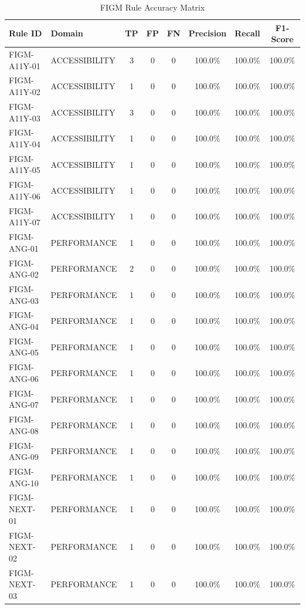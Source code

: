 \begin{table}[htbp]
\centering
\caption{FIGM Rule Accuracy Matrix}
\label{tab:rule_eval_results}
\begin{tabular}{llcccccc}
\toprule
\textbf{Rule ID} & \textbf{Domain} & \textbf{TP} & \textbf{FP} & \textbf{FN} & \textbf{Precision} & \textbf{Recall} & \textbf{F1-Score} \\
\midrule
FIGM-A11Y-01 & ACCESSIBILITY & 3 & 0 & 0 & 100.0\% & 100.0\% & 100.0\% \\
FIGM-A11Y-02 & ACCESSIBILITY & 1 & 0 & 0 & 100.0\% & 100.0\% & 100.0\% \\
FIGM-A11Y-03 & ACCESSIBILITY & 3 & 0 & 0 & 100.0\% & 100.0\% & 100.0\% \\
FIGM-A11Y-04 & ACCESSIBILITY & 1 & 0 & 0 & 100.0\% & 100.0\% & 100.0\% \\
FIGM-A11Y-05 & ACCESSIBILITY & 1 & 0 & 0 & 100.0\% & 100.0\% & 100.0\% \\
FIGM-A11Y-06 & ACCESSIBILITY & 1 & 0 & 0 & 100.0\% & 100.0\% & 100.0\% \\
FIGM-A11Y-07 & ACCESSIBILITY & 1 & 0 & 0 & 100.0\% & 100.0\% & 100.0\% \\
FIGM-ANG-01 & PERFORMANCE & 1 & 0 & 0 & 100.0\% & 100.0\% & 100.0\% \\
FIGM-ANG-02 & PERFORMANCE & 2 & 0 & 0 & 100.0\% & 100.0\% & 100.0\% \\
FIGM-ANG-03 & PERFORMANCE & 1 & 0 & 0 & 100.0\% & 100.0\% & 100.0\% \\
FIGM-ANG-04 & PERFORMANCE & 1 & 0 & 0 & 100.0\% & 100.0\% & 100.0\% \\
FIGM-ANG-05 & PERFORMANCE & 1 & 0 & 0 & 100.0\% & 100.0\% & 100.0\% \\
FIGM-ANG-06 & PERFORMANCE & 1 & 0 & 0 & 100.0\% & 100.0\% & 100.0\% \\
FIGM-ANG-07 & PERFORMANCE & 1 & 0 & 0 & 100.0\% & 100.0\% & 100.0\% \\
FIGM-ANG-08 & PERFORMANCE & 1 & 0 & 0 & 100.0\% & 100.0\% & 100.0\% \\
FIGM-ANG-09 & PERFORMANCE & 1 & 0 & 0 & 100.0\% & 100.0\% & 100.0\% \\
FIGM-ANG-10 & PERFORMANCE & 1 & 0 & 0 & 100.0\% & 100.0\% & 100.0\% \\
FIGM-NEXT-01 & PERFORMANCE & 1 & 0 & 0 & 100.0\% & 100.0\% & 100.0\% \\
FIGM-NEXT-02 & PERFORMANCE & 1 & 0 & 0 & 100.0\% & 100.0\% & 100.0\% \\
FIGM-NEXT-03 & PERFORMANCE & 1 & 0 & 0 & 100.0\% & 100.0\% & 100.0\% \\

\end{tabular}
\end{table}
